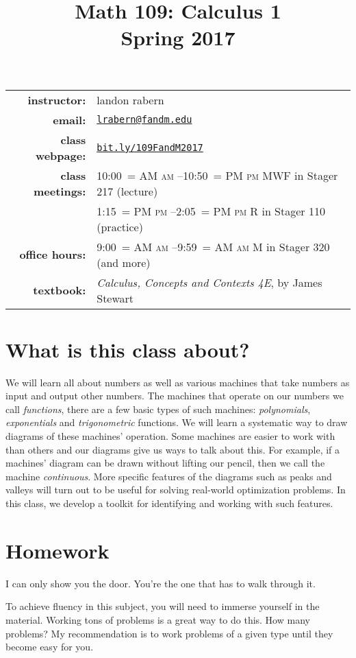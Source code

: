 \documentclass[12pt]{article}
\title{Math 109: Calculus 1\\ \bigskip\small{Spring 2017}}
\date{}
\makeatletter
\DeclareRobustCommand{\maybefakesc}[1]{%
  \ifnum\pdfstrcmp{\f@series}{\bfdefault}=\z@
    {\fontsize{\dimexpr0.8\dimexpr\f@size pt\relax}{0}\selectfont\uppercase{#1}}%
  \else
    \textsc{#1}%
  \fi
}
\newcommand\AM{\,\maybefakesc{am}\xspace}
\newcommand\PM{\,\maybefakesc{pm}\xspace}
\makeatother
\begin{document}
\maketitle

\begin{tabular}{r l}
\textbf{instructor:}& landon rabern\\
\textbf{email:}& \href{mailto:lrabern@fandm.edu}{\nolinkurl{lrabern@fandm.edu}}\\
\textbf{class webpage:}& \href{http://bit.ly/109FandM2017}{\nolinkurl{bit.ly/109FandM2017}}\\
\textbf{class meetings:}& 10:00\AM--10:50\PM MWF in Stager 217 (lecture)\\
& 1:15\PM--2:05\PM R in Stager 110 (practice)\\
\textbf{office hours:}& 9:00\AM--9:59\AM M in Stager 320 (and more)\\
\textbf{textbook:}&\textit{Calculus, Concepts and Contexts 4E}, by James Stewart\\
\end{tabular}

\bigskip

\section*{What is this class about?}
We will learn all about numbers as well as various machines that take numbers as input and output other numbers.
The machines that operate on our numbers we call \emph{functions}, there are a few basic types of such machines: \emph{polynomials}, \emph{exponentials} and \emph{trigonometric} functions.
We will learn a systematic way to draw diagrams of these machines' operation.  Some machines are easier to work with than others and our diagrams give us ways to talk about this.  For
example, if a machines' diagram can be drawn without lifting our pencil, then we call the machine \emph{continuous}.  More specific features of the diagrams such as peaks and valleys will turn out
to be useful for solving real-world optimization problems.  In this class, we develop a toolkit for identifying and working with such features.
\section*{Homework} 
\epigraph{I can only show you the door. You're the one that has to walk through it.}{}
To achieve fluency in this subject, you will need to immerse yourself in the material.  
Working tons of problems is a great way to do this.  How many problems?  
My recommendation is to work problems of a given type until they become easy for you.
\end{document}
